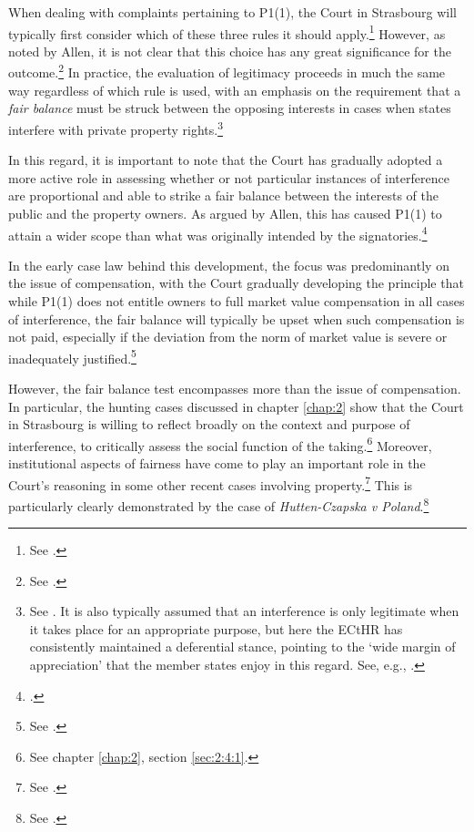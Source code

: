 When dealing with complaints pertaining to P1(1), the Court in Strasbourg will typically first consider which of these three rules it should apply.\footnote{See \cite[102-104]{allen05}.} However, as noted by Allen, it is not clear that this choice has any great significance for the outcome.\footnote{See \cite[104-105]{allen05}.} In practice, the evaluation of legitimacy proceeds in much the same way regardless of which rule is used, with an emphasis on the requirement that a {\it fair balance} must be struck between the opposing interests in cases when states interfere with private property rights.\footnote{See \cite[103]{allen05}. It is also typically assumed that an interference is only legitimate when it takes place for an appropriate purpose, but here the ECtHR has consistently maintained a deferential stance, pointing to the `wide margin of appreciation' that the member states enjoy in this regard. See, e.g., \cite[54]{james86}.}

In this regard, it is important to note that the Court has gradually adopted a more active role in assessing whether or not particular instances of interference are proportional and able to strike a fair balance between the interests of the public and the property owners. As argued by Allen, this has caused P1(1) to attain a wider scope than what was originally intended by the signatories.\footcite[1055]{allen10}

In the early case law behind this development, the focus was predominantly on the issue of compensation, with the Court gradually developing the principle that while P1(1) does not entitle owners to full market value compensation in all cases of interference, the fair balance will typically be upset when such compensation is not paid, especially if the deviation from the norm of market value is severe or inadequately justified.\footnote{See \cite[103]{scordino06}.}

However, the fair balance test encompasses more than the issue of compensation. In particular, the hunting cases discussed in chapter \ref{chap:2} show that the Court in Strasbourg is willing to reflect broadly on the context and purpose of interference, to critically assess the social function of the taking.\footnote{See chapter \ref{chap:2}, section \ref{sec:2:4:1}.} Moreover, institutional aspects of fairness have come to play an important role in the Court's reasoning in some other recent cases involving property.\footnote{See \cite{hutten06,lindheim12}.} This is particularly clearly demonstrated by the case of {\it Hutten-Czapska v Poland}.\footnote{See \cite{hutten06}.}

